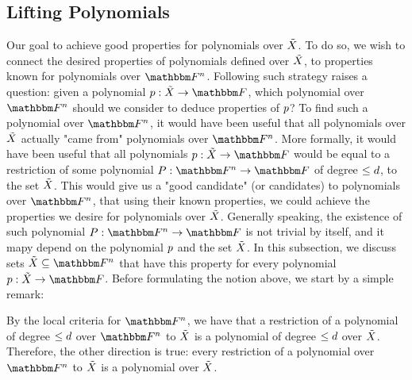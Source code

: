 \subsection[Lifting Polynomials]{Lifting Polynomials}\label{subsec:lifting-polynomials}
Our goal to achieve good properties for polynomials over ${\tilde{X}}$.
To do so, we wish to connect the desired properties of polynomials defined over ${\tilde{X}}$, to properties known for polynomials over $\field$.
Following such strategy raises a question: given a polynomial $\funcdef{\onvarpoly}{\variety}{\basefield}$, which polynomial over $\field$ should we consider to deduce properties of $\onvarpoly$?
To find such a polynomial over $\field$, it would have been useful that all polynomials over ${\tilde{X}}$ actually "came from" polynomials over $\field$.
More formally, it would have been useful that all polynomials $\funcdef{\onvarpoly}{\variety}{\basefield}$ would be equal to a restriction of some polynomial $\funcdef{\genpoly}{\field}{\basefield}$ of degree $\leq d$, to the set ${\tilde{X}}$.
This would give us a "good candidate" (or candidates) to polynomials over $\field$, that using their known properties, we could achieve the properties we desire for polynomials over ${\tilde{X}}$.
\newline
Generally speaking, the existence of such polynomial $\funcdef{\genpoly}{\field}{\basefield}$ is not trivial by itself, and it mapy depend on the polynomial $\onvarpoly$ and the set ${\tilde{X}}$.
In this subsection, we discuss sets $\variety \subseteq \field$ that have this property for every polynomial $\funcdef{\onvarpoly}{\variety}{\basefield}$.
Before formulating the notion above, we start by a simple remark:
\begin{remark}
    By the local criteria for $\field$, we have that a restriction of a polynomial of degree $\leq d$ over $\field$ to ${\tilde{X}}$ is a polynomial of degree $\leq d $ over ${\tilde{X}}$.
    Therefore, the other direction is true: every restriction of a polynomial over $\field$ to ${\tilde{X}}$ is a polynomial over ${\tilde{X}}$.
\end{remark}
%

